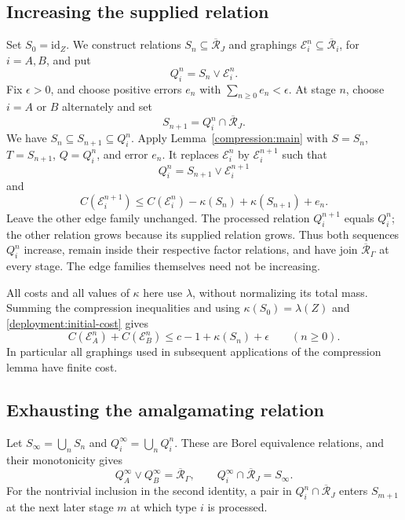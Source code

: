 \subsection{Increasing the supplied relation}
\label{deployment:iteration}

Set \(S_0=\mathrm{id}_Z\).  We construct relations
\(S_n\subseteq\overline{\mathcal R}_J\) and graphings
\(\mathcal E_i^n\subseteq\overline{\mathcal R}_i\), for \(i=A,B\),
and put
\[
 Q_i^n=S_n\vee\mathcal E_i^n.
\]
Fix \(\epsilon>0\), and choose positive errors \(e_n\) with
\(\sum_{n\geq0}e_n<\epsilon\).
At stage \(n\), choose \(i=A\) or \(B\) alternately and set
\[
 S_{n+1}=Q_i^n\cap\overline{\mathcal R}_J.
\]
We have \(S_n\subseteq S_{n+1}\subseteq Q_i^n\).  Apply
Lemma~\ref{compression:main} with
\(S=S_n\), \(T=S_{n+1}\), \(Q=Q_i^n\), and error \(e_n\).
It replaces \(\mathcal E_i^n\) by \(\mathcal E_i^{n+1}\) such that
\[
 Q_i^n=S_{n+1}\vee\mathcal E_i^{n+1}
\]
and
\[
 C(\mathcal E_i^{n+1})
 \leq C(\mathcal E_i^n)-\kappa(S_n)+\kappa(S_{n+1})+e_n.
\]
Leave the other edge family unchanged.  The processed relation
\(Q_i^{n+1}\) equals \(Q_i^n\); the other relation grows because its
supplied relation grows.  Thus both sequences \(Q_i^n\) increase,
remain inside their respective factor relations, and have join
\(\overline{\mathcal R}_\Gamma\) at every stage.  The edge families
themselves need not be increasing.

All costs and all values of \(\kappa\) here use \(\lambda\), without
normalizing its total mass.  Summing the compression inequalities and
using \(\kappa(S_0)=\lambda(Z)\) and
\eqref{deployment:initial-cost} gives
\begin{equation}
\label{deployment:finite-bound}
 C(\mathcal E_A^n)+C(\mathcal E_B^n)
  \leq c-1+\kappa(S_n)+\epsilon
  \qquad(n\geq0).
\end{equation}
In particular all graphings used in subsequent applications of the
compression lemma have finite cost.

\subsection{Exhausting the amalgamating relation}
\label{deployment:limit}

Let \(S_\infty=\bigcup_nS_n\) and
\(Q_i^\infty=\bigcup_nQ_i^n\).  These are Borel equivalence relations,
and their monotonicity gives
\begin{equation}
\label{deployment:intersections}
 Q_A^\infty\vee Q_B^\infty=\overline{\mathcal R}_\Gamma,
 \qquad Q_i^\infty\cap\overline{\mathcal R}_J=S_\infty.
\end{equation}
For the nontrivial inclusion in the second identity, a pair in
\(Q_i^n\cap\overline{\mathcal R}_J\) enters \(S_{m+1}\) at the next
later stage \(m\) at which type \(i\) is processed.

